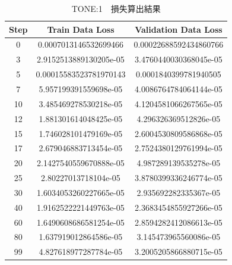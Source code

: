 \documentclass{jreport}		%
\begin{document}
\begin{table}
  \begin{center}
  \caption{TONE:1　損失算出結果}
  \begin{tabular}{c|cc} \hline
Step&Train Data Loss&Validation Data Loss \\ \hline
0&0.0007013146532699466&0.00022688592434860766 \\
3&2.9152513889130205e-05&3.4760440030368045e-05 \\
5&0.00015583523781970143&0.0001840399781940505 \\
7&5.957199391559698e-05&4.0086764784064144e-05 \\
10&3.485469278530218e-05&4.1204581066267565e-05 \\
12&1.881301614048425e-05&4.296326369512826e-05 \\
15&1.746028101479169e-05&2.6004530809586868e-05 \\
17&2.679046883713454e-05&2.7524380129761994e-05 \\
20&2.1427540559670888e-05&4.987289139535278e-05 \\
25&2.80227013718104e-05&3.8780399336246774e-05 \\
30&1.6034053260227665e-05&2.935692282335367e-05 \\
40&1.9162522221449763e-05&2.3683454855927266e-05 \\
60&1.6490608686581254e-05&2.8594282412086613e-05 \\
80&1.637919012864586e-05&3.145473965560086e-05 \\
99&4.827618977287784e-05&3.2005205866880715e-05 \\ \hline
  \end{tabular}
  \end{center}
\end{table}
\end{document}

